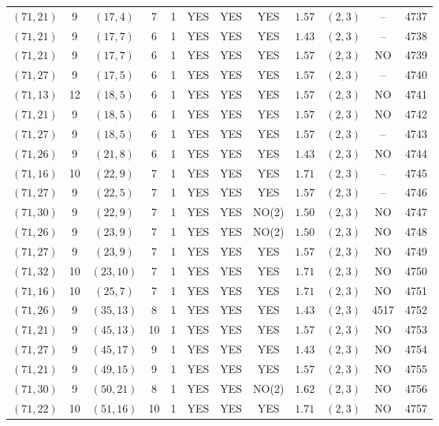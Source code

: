 \begin{longtable}{|c|c|c|c|c|c|c|c|c|c|c|c|}
$(71,21)$ & 9 & $(17,4)$ & 7 & 1 & YES & YES & YES & $1.57$ & $(2,3)$ & -- & 4737\\
$(71,21)$ & 9 & $(17,7)$ & 6 & 1 & YES & YES & YES & $1.43$ & $(2,3)$ & -- & 4738\\
$(71,21)$ & 9 & $(17,7)$ & 6 & 1 & YES & YES & YES & $1.57$ & $(2,3)$ & NO & 4739\\
$(71,27)$ & 9 & $(17,5)$ & 6 & 1 & YES & YES & YES & $1.57$ & $(2,3)$ & -- & 4740\\
$(71,13)$ & 12 & $(18,5)$ & 6 & 1 & YES & YES & YES & $1.57$ & $(2,3)$ & NO & 4741\\
$(71,21)$ & 9 & $(18,5)$ & 6 & 1 & YES & YES & YES & $1.57$ & $(2,3)$ & NO & 4742\\
$(71,27)$ & 9 & $(18,5)$ & 6 & 1 & YES & YES & YES & $1.57$ & $(2,3)$ & -- & 4743\\
$(71,26)$ & 9 & $(21,8)$ & 6 & 1 & YES & YES & YES & $1.43$ & $(2,3)$ & NO & 4744\\
$(71,16)$ & 10 & $(22,9)$ & 7 & 1 & YES & YES & YES & $1.71$ & $(2,3)$ & -- & 4745\\
$(71,27)$ & 9 & $(22,5)$ & 7 & 1 & YES & YES & YES & $1.57$ & $(2,3)$ & -- & 4746\\
$(71,30)$ & 9 & $(22,9)$ & 7 & 1 & YES & YES & NO(2) & $1.50$ & $(2,3)$ & NO & 4747\\
$(71,26)$ & 9 & $(23,9)$ & 7 & 1 & YES & YES & NO(2) & $1.50$ & $(2,3)$ & NO & 4748\\
$(71,27)$ & 9 & $(23,9)$ & 7 & 1 & YES & YES & YES & $1.57$ & $(2,3)$ & NO & 4749\\
$(71,32)$ & 10 & $(23,10)$ & 7 & 1 & YES & YES & YES & $1.71$ & $(2,3)$ & NO & 4750\\
$(71,16)$ & 10 & $(25,7)$ & 7 & 1 & YES & YES & YES & $1.71$ & $(2,3)$ & NO & 4751\\
$(71,26)$ & 9 & $(35,13)$ & 8 & 1 & YES & YES & YES & $1.43$ & $(2,3)$ & 4517 & 4752\\
$(71,21)$ & 9 & $(45,13)$ & 10 & 1 & YES & YES & YES & $1.57$ & $(2,3)$ & NO & 4753\\
$(71,27)$ & 9 & $(45,17)$ & 9 & 1 & YES & YES & YES & $1.43$ & $(2,3)$ & NO & 4754\\
$(71,21)$ & 9 & $(49,15)$ & 9 & 1 & YES & YES & YES & $1.57$ & $(2,3)$ & NO & 4755\\
$(71,30)$ & 9 & $(50,21)$ & 8 & 1 & YES & YES & NO(2) & $1.62$ & $(2,3)$ & NO & 4756\\
$(71,22)$ & 10 & $(51,16)$ & 10 & 1 & YES & YES & YES & $1.71$ & $(2,3)$ & NO & 4757\\

\end{longtable}
